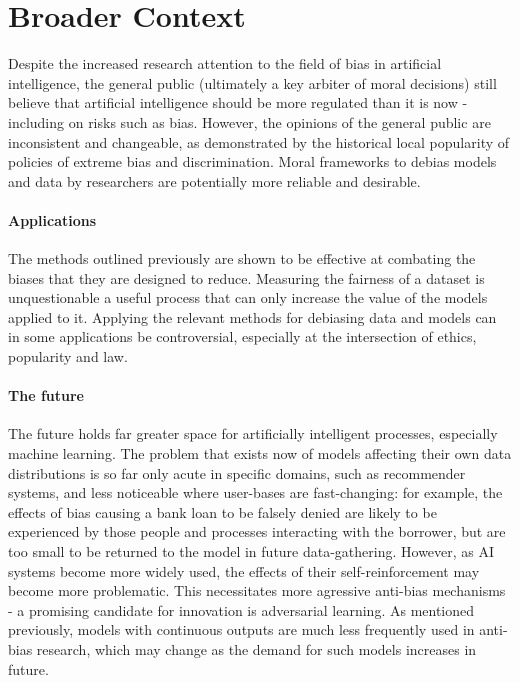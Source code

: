 \documentclass[conference]{IEEEtran}
\begin{document}
\section{Broader Context}
Despite the increased research attention to the field of bias in artificial intelligence, the general public (ultimately a key arbiter of moral decisions) still believe that artificial intelligence should be more regulated than it is now - including on risks such as bias. However, the opinions of the general public are inconsistent and changeable, as demonstrated by the historical local popularity of policies of extreme bias and discrimination. Moral frameworks to debias models and data by researchers are potentially more reliable and desirable.

\paragraph{Applications} The methods outlined previously are shown to be effective at combating the biases that they are designed to reduce. Measuring the fairness of a dataset is unquestionable a useful process that can only increase the value of the models applied to it. Applying the relevant methods for debiasing data and models can in some applications be controversial, especially at the intersection of ethics, popularity and law.

\paragraph{The future}
The future holds far greater space for artificially intelligent processes, especially machine learning. The problem that exists now of models affecting their own data distributions is so far only acute in specific domains, such as recommender systems, and less noticeable where user-bases are fast-changing: for example, the effects of bias causing a bank loan to be falsely denied are likely to be experienced by those people and processes interacting with the borrower, but are too small to be returned to the model in future data-gathering. However, as AI systems become more widely used, the effects of their self-reinforcement may become more problematic. This necessitates more agressive anti-bias mechanisms - a promising candidate for innovation is adversarial learning. As mentioned previously, models with continuous outputs are much less frequently used in anti-bias research, which may change as the demand for such models increases in future.
\end{document}
